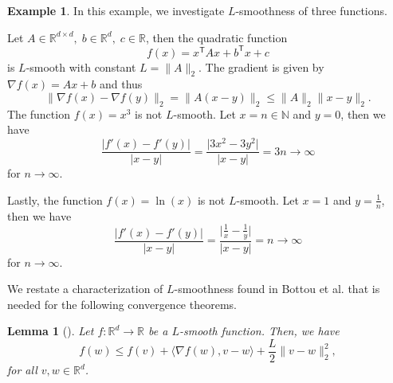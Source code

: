 \documentclass[12pt]{article}
\newtheorem{lemma}[lemma]{Lemma}
\theoremstyle{definition}
\newtheorem{example}[example]{Example}
\numberwithin{equation}{section}
\newcommand{\N}{\mathbb{N}}
\newcommand{\R}{\mathbb{R}}
\newcommand{\T}{\mathsf{T}}
\newcommand{\norm}[1]{\lVert{#1}\rVert_2}
\begin{document}
\begin{example}
  In this example, we investigate $L$-smoothness of three functions. 

  Let $A \in \R^{d \times d},\; b \in \R^d,\; c \in \R$, then the quadratic function
  \begin{equation*}
    f(x) = x^\T A x + b^\T x + c
  \end{equation*}
  is $L$-smooth with constant $L = \norm{A}$. The gradient is given by $\nabla f(x)  = Ax + b$ and thus
  \begin{equation*}
    \norm{\nabla f(x) - \nabla f(y)} = \norm{A(x-y)} \leq \norm{A} \norm{x-y}.
  \end{equation*}
  The function $f(x) = x^3$ is not $L$-smooth. Let $x = n \in \N$ and $y = 0$, then we have
  \begin{equation*}
    \frac{\lvert f'(x) - f'(y) \rvert}{\lvert x - y \rvert} = \frac{\lvert3x^2 - 3 y^2 \rvert}{\lvert x-y \rvert} = 3n \rightarrow \infty
  \end{equation*}
  for $n \rightarrow \infty$.

  Lastly, the function $f(x) = \ln(x)$ is not $L$-smooth. Let $x = 1$ and $y = \frac{1}{n}$, then we have
  \begin{equation*}
    \frac{\lvert f'(x) - f'(y) \rvert}{\lvert x - y \rvert} = \frac{\lvert \frac{1}{x}- \frac{1}{y} \rvert}{\lvert x-y \rvert} = n \rightarrow \infty
  \end{equation*}
  for $n \rightarrow \infty$. 
\end{example}
We restate a characterization of $L$-smoothness found in Bottou et al.\cite{bottouOptimizationMethodsLargeScale2018} that is needed for the following convergence theorems.
\begin{lemma}[]
  Let $f : \R^d \rightarrow \R$ be a $L$-smooth function. Then, we have 
  \begin{equation}
    f(w) \leq f(v) + \langle \nabla f(w), v - w \rangle + \frac{L}{2} \norm{ v - w }^2,
  \end{equation}
  for all $v, w \in \R^d$.
\end{lemma}
\end{document}
